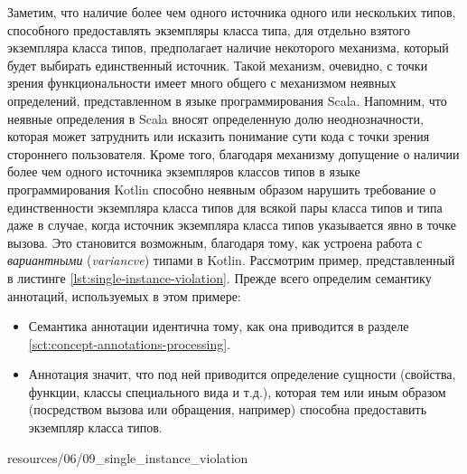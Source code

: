Заметим, что наличие более чем одного источника одного или нескольких типов, способного предоставлять экземпляры класса типа, для отдельно взятого экземпляра класса типов, предполагает наличие некоторого механизма, который будет выбирать единственный источник. Такой механизм, очевидно, с точки зрения функциональности имеет много общего с механизмом неявных определений, представленном в языке программирования Scala. Напомним, что неявные определения в Scala вносят определенную долю неоднозначности, которая может затруднить или исказить понимание сути кода с точки зрения стороннего пользователя. Кроме того, благодаря механизму  допущение о наличии более чем одного источника экземпляров классов типов в языке программирования Kotlin способно неявным образом нарушить требование о  единственности экземпляра класса типов для всякой пары класса типов и типа даже в случае, когда источник экземпляра класса типов указывается явно в точке вызова. Это становится возможным, благодаря тому, как устроена работа с \emph{вариантными} (\emph{variancve}) типами в Kotlin. Рассмотрим пример, представленный в листинге \ref{lst:single-instance-violation}. Прежде всего определим семантику аннотаций, используемых в этом примере:
\begin{itemize}
    \item Семантика аннотации  идентична тому, как она приводится в разделе \ref{sct:concept-annotations-processing}.  
    \item Аннотация  значит, что под ней приводится определение сущности (свойства, функции, классы специального вида и т.д.), которая тем или иным образом (посредством вызова или обращения, например) способна предоставить экземпляр класса типов.     
\end{itemize}


{resources/06/09_single_instance_violation}

